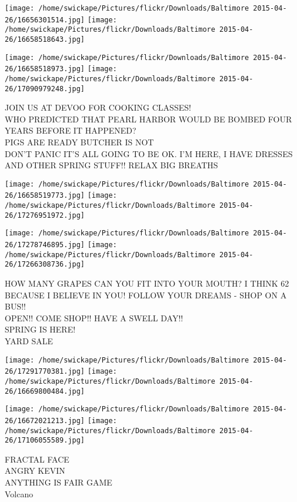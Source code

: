 \documentclass[10pt,letterpaper]{article}
\begin{document}
\texttt{[image: /home/swickape/Pictures/flickr/Downloads/Baltimore 2015-04-26/16656301514.jpg]}
\texttt{[image: /home/swickape/Pictures/flickr/Downloads/Baltimore 2015-04-26/16658518643.jpg]}

\texttt{[image: /home/swickape/Pictures/flickr/Downloads/Baltimore 2015-04-26/16658518973.jpg]}
\texttt{[image: /home/swickape/Pictures/flickr/Downloads/Baltimore 2015-04-26/17090979248.jpg]}

JOIN US AT DEVOO FOR COOKING CLASSES!\\
WHO PREDICTED THAT PEARL HARBOR WOULD BE BOMBED FOUR YEARS BEFORE IT HAPPENED?\\
PIGS ARE READY BUTCHER IS NOT\\
DON'T PANIC IT'S ALL GOING TO BE OK.  I'M HERE, I HAVE DRESSES AND OTHER SPRING STUFF!!  RELAX BIG BREATHS
\pagebreak

\texttt{[image: /home/swickape/Pictures/flickr/Downloads/Baltimore 2015-04-26/16658519773.jpg]}
\texttt{[image: /home/swickape/Pictures/flickr/Downloads/Baltimore 2015-04-26/17276951972.jpg]}

\texttt{[image: /home/swickape/Pictures/flickr/Downloads/Baltimore 2015-04-26/17278746895.jpg]}
\texttt{[image: /home/swickape/Pictures/flickr/Downloads/Baltimore 2015-04-26/17266308736.jpg]}

HOW MANY GRAPES CAN YOU FIT INTO YOUR MOUTH?  I THINK 62 BECAUSE I BELIEVE IN YOU!  FOLLOW YOUR DREAMS {-} SHOP ON A BUS!!\\
OPEN!! COME SHOP!! HAVE A SWELL DAY!!\\
SPRING IS HERE!\\
YARD SALE
\pagebreak

\texttt{[image: /home/swickape/Pictures/flickr/Downloads/Baltimore 2015-04-26/17291770381.jpg]}
\texttt{[image: /home/swickape/Pictures/flickr/Downloads/Baltimore 2015-04-26/16669800484.jpg]}

\texttt{[image: /home/swickape/Pictures/flickr/Downloads/Baltimore 2015-04-26/16672021213.jpg]}
\texttt{[image: /home/swickape/Pictures/flickr/Downloads/Baltimore 2015-04-26/17106055589.jpg]}

FRACTAL FACE\\
ANGRY KEVIN\\
ANYTHING IS FAIR GAME\\
Volcano
\pagebreak
\end{document}
